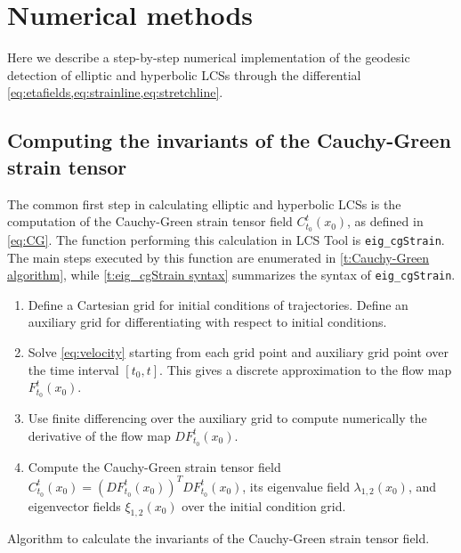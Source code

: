 \documentclass{article}
\begin{document}
\clearpage

\section{Numerical methods}

Here we describe a step-by-step numerical implementation of the geodesic detection of elliptic and hyperbolic LCSs through the differential \cref{eq:etafields,eq:strainline,eq:stretchline}.

\subsection{Computing the invariants of the Cauchy-Green strain tensor}

The common first step in calculating elliptic and hyperbolic LCSs is the computation of the Cauchy-Green strain tensor field $C_{t_0}^t(x_0)$, as defined in \cref{eq:CG}. The function performing this calculation in LCS Tool is \lstinline!eig_cgStrain!. The main steps executed by this function are enumerated in \cref{t:Cauchy-Green algorithm}, while \cref{t:eig_cgStrain syntax} summarizes the syntax of \lstinline!eig_cgStrain!.

\begin{table}
\begin{enumerate}
\item Define a Cartesian grid for initial conditions of trajectories. Define
an auxiliary grid for differentiating with respect to initial conditions.
\item Solve \cref{eq:velocity} starting from each grid point and auxiliary grid point over the time interval $[t_0,t]$. This gives a discrete approximation to the flow map $F_{t_0}^t(x_0)$.
\item Use finite differencing over the auxiliary grid to compute numerically the derivative of the flow map $DF_{t_0}^t(x_0)$.
\item Compute the Cauchy-Green strain tensor field $C_{t_0}^t(x_0) = \left(DF_{t_0}^t(x_0)\right)^T DF_{t_0}^t(x_0)$, its eigenvalue field $\lambda_{1,2}(x_0)$, and eigenvector fields $\xi_{1,2}(x_0)$ over the initial condition grid.
\end{enumerate}
\caption{Algorithm to calculate the invariants of the Cauchy-Green strain tensor field.}
\label{t:Cauchy-Green algorithm}
\end{table}
\end{document}
